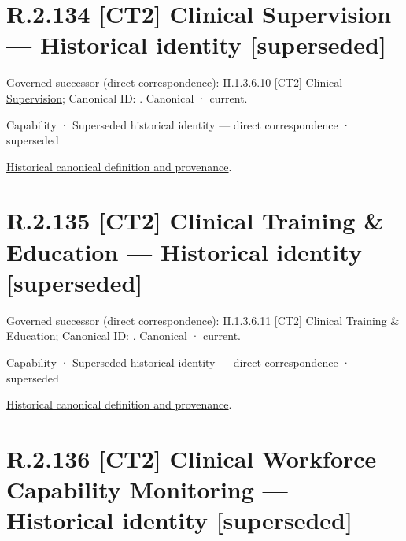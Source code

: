 \section*{R.2.134 [CT2] Clinical Supervision — Historical identity [superseded]}
\label{navigation:R.2.134}

{\small Governed successor (direct correspondence): II.1.3.6.10 \hyperref[element:f697b1ac79b544749315f31819b17969]{[CT2] Clinical Supervision}; Canonical ID: \texttt{}. Canonical · current.}\par
\label{element:50c838981f3946d78e8f78d18e31c70c}
{\small Capability · Superseded historical identity — direct correspondence · superseded}\par
\href{../../../../../../../continuum/strategy/capability/50c838981f3946d78e8f78d18e31c70c.md}{Historical canonical definition and provenance}.\par
\section*{R.2.135 [CT2] Clinical Training \& Education — Historical identity [superseded]}
\label{navigation:R.2.135}

{\small Governed successor (direct correspondence): II.1.3.6.11 \hyperref[element:d016f35ffbc345d99d7281e968c14ddb]{[CT2] Clinical Training \& Education}; Canonical ID: \texttt{}. Canonical · current.}\par
\label{element:df8bff7df9c1469da16cac6a5eb2bf76}
{\small Capability · Superseded historical identity — direct correspondence · superseded}\par
\href{../../../../../../../continuum/strategy/capability/df8bff7df9c1469da16cac6a5eb2bf76.md}{Historical canonical definition and provenance}.\par
\section*{R.2.136 [CT2] Clinical Workforce Capability Monitoring — Historical identity [superseded]}
\label{navigation:R.2.136}

